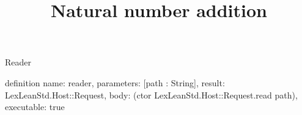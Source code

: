 \begin{lexlean}{Reader}
\title{Natural number addition}
\begin{semanticmodule}
definition{
  name: reader,
  parameters: [path : String],
  result: LexLeanStd.Host::Request,
  body: (ctor LexLeanStd.Host::Request.read path),
  executable: true
}
\end{semanticmodule}
\end{lexlean}
